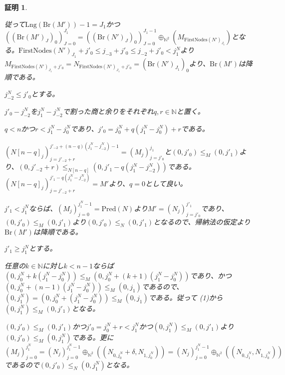 \documentclass[dvipdfmx,uplatex]{jsarticle}
\theoremstyle{customnonumberbreakfortheorem}
\theoremstyle{customnonumberbreakforproof}
\newtheorem{hideableproof}{証明}
\begin{document}
\begin{hideableproof}
\begin{indented}
\begin{indented}
\begin{indented}
\begin{indented}
\begin{indented}
\begin{indented}
\begin{indented}
								\item 従って\(\textrm{Lng}(\textrm{Br}(M'))-1 = J_1\)かつ\(((\textrm{Br}(M')_J)_0)_{J=0}^{J_1} = ((\textrm{Br}(N')_J)_0)_{J=0}^{J_1-1} \oplus_{\mathbb{N}^2} (M_{\textrm{FirstNodes}(N')_{J_1}})\)となる。\(\textrm{FirstNodes}(N')_{J_1}+j'_0 \leq j_{-3}+j'_0 \leq j_{-2}+j'_0 < j_1^N\)より\(M_{\textrm{FirstNodes}(N')_{J_1}+j'_0} = N_{\textrm{FirstNodes}(N')_{J_1}+j'_0} = (\textrm{Br}(N')_{J_1})_0\)より、\(\textrm{Br}(M')\)は降順である。
							\end{indented}
						\end{indented}
					\end{indented}
					\item
					\item \(j_{-2}^N \leq j'_0\)とする。
					\begin{indented}
						\item \(j'_0-j_{-2}^N\)を\(j_1^N-j_{-2}^N\)で割った商と余りをそれぞれ\(q,r \in \mathbb{N}\)と置く。
						\item \(q < n\)かつ\(r < j_1^N-j_0^N\)であり、\(j'_0 = j_0^N+q(j_1^N-j_0^N)+r\)である。
						\item \((N[n-q]_j)_{j=j'_{-2}+r}^{j'_{-2}+(n-q)(j_1^N-j_{-2}^N)-1} = (M_j)_{j=j'_0}^{j_1}\)と\((0,j'_0) \leq_M (0,j'_1)\)より、\((0,j'_{-2}+r) \leq_{N[n-q]} (0,j'_1-q(j_1^N-j_{-2}^N))\)である。\((N[n-q]_j)_{j=j'_{-2}+r}^{j'_1-q(j_1^N-j_{-2}^N)} = M'\)より、\(q = 0\)として良い。
						\item \(j'_1 < j_1^N\)ならば、\((M_j)_{j=0}^{j_1^N-1} = \textrm{Pred}(N)\)より\(M' = (N_j)_{j=j'_0}^{j'_1}\)であり、\((0,j'_0) \leq_M (0,j'_1)\)より\((0,j'_0) \leq_N (0,j'_1)\)となるので、帰納法の仮定より\(\textrm{Br}(M')\)は降順である。
						\item \(j'_1 \geq j_1^N\)とする。
						\begin{indented}
							\item 任意の\(k \in \mathbb{N}\)に対し\(k < n-1\)ならば\((0,j_0^N+k(j_1^N-j_0^N)) \leq_M (0,j_0^N+(k+1)(j_1^N-j_0^N))\)であり、かつ\((0,j_0^N+(n-1)(j_1^N-j_0^N)) \leq_M (0,j_1)\)であるので、\((0,j_1^N) = (0,j_0^N+(j_1^N-j_0^N)) \leq_M (0,j_1)\)である。従って (1)から\((0,j_1^N) \leq_M (0,j'_1)\)となる。
							\item \((0,j'_0) \leq_M (0,j'_1)\)かつ\(j'_0 = j_0^N+r < j_1^N\)かつ\((0,j_1^N) \leq_M (0,j'_1)\)より\((0,j'_0) \leq_M (0,j_1^N)\)である。更に\((M_j)_{j=0}^{j_1^N} = (N_j)_{j=0}^{j_1^N-1} \oplus_{\mathbb{N}^2} ((N_{0,j_0^N}+\delta,N_{1,j_0^N})) = (N_j)_{j=0}^{j_1^N-1} \oplus_{\mathbb{N}^2} ((N_{0,j_1^N},N_{1,j_0^N}))\)であるので\((0,j'_0) \leq_N (0,j_1^N)\)となる。

\end{indented}
\end{indented}
\end{indented}
\end{indented}
\end{indented}
\end{indented}
\end{hideableproof}
\end{document}
